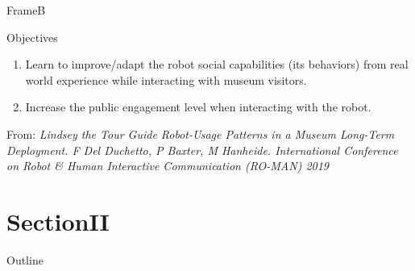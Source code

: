 \documentclass[english,svgnames,notes=hide,aspectratio=169,14pt]{beamer}
\begin{document}

\begin{frame}{FrameB}

   \begin{block}{Objectives}
      \begin{enumerate}
         \item Learn to improve/adapt the robot social capabilities
               (its behaviors) from real world experience while interacting
               with museum visitors.
         \item Increase the public engagement level when interacting with
               the robot.
      \end{enumerate}
   \end{block}

   \begin{block}{}
      \tiny{From:}
      \emph{Lindsey the Tour Guide Robot-Usage Patterns in a Museum
            Long-Term Deployment. F Del Duchetto, P Baxter, M Hanheide.
            International Conference on Robot \& Human Interactive
            Communication (RO-MAN) 2019}
   \end{block}

\end{frame}


\section{SectionII}


\begin{frame}{Outline}

   \tableofcontents[currentsection]

\end{frame}

\end{document}
